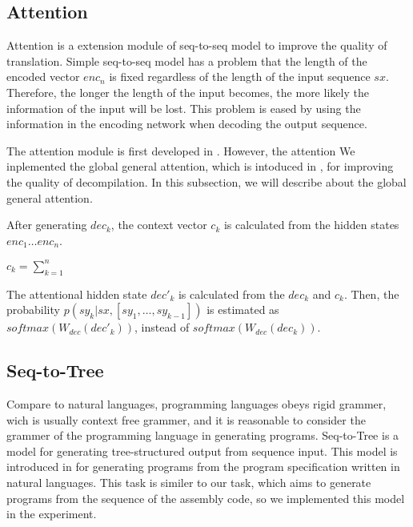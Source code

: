 \documentclass[senior,final,11pt]{iscs-thesis}
\begin{document}





\subsection{Attention}
Attention is a extension module of seq-to-seq model to improve the quality of translation. 
Simple seq-to-seq model has a problem that the length of the encoded vector $enc_{n}$ is fixed 
regardless of the length of the input sequence $sx$. 
Therefore, the longer the length of the input becomes, the more likely the information of the input will be lost.
This problem is eased by using the information in the encoding network when decoding the output sequence.

The attention module is first developed in \cite{attention_paper}.
However, the attention 
We inplemented the global general attention, which is intoduced in \cite{dot_attention}, for improving the quality of decompilation.
In this subsection, we will describe about the global general attention.



After generating $ dec_{k} $, the context vector $ c_{k} $ is calculated from the hidden states $ enc_{1} \dots enc_{n} $.

$ c_{k} = \sum_{k=1}^{n} $ 

The attentional hidden state $ dec'_{k} $ is calculated from the $ dec_{k} $ and $ c_{k} $.
Then, the probability $ p(sy_k|sx,[sy_1,\dots,sy_{k-1}]) $ is estimated as $ softmax(W_{dec}(dec'_{k}))$, instead of $ softmax(W_{dec}(dec_{k}))$.




\subsection{Seq-to-Tree}
Compare to natural languages, programming languages obeys rigid grammer, wich is usually context free grammer,  
and it is reasonable to consider the grammer of the programming language in generating programs.
Seq-to-Tree is a model for generating tree-structured output from sequence input. This model is introduced in \cite{Seq2Tree} for generating programs from the program specification written in natural languages. 
This task is similer to our task, which aims to generate programs from the sequence of the assembly code, so we implemented this model in the experiment.
\end{document}
